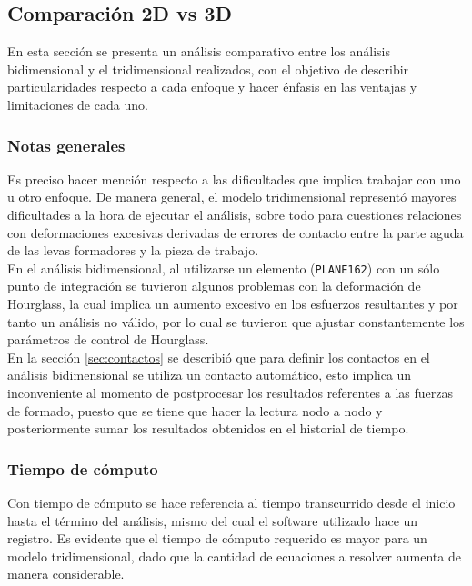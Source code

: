\subsection{Comparación 2D vs 3D}

En esta sección se presenta un análisis comparativo entre los análisis bidimensional 
y el tridimensional realizados, con el objetivo de describir particularidades respecto 
a cada enfoque y hacer énfasis en las ventajas y limitaciones de cada uno.\\

\subsubsection{Notas generales}

Es preciso hacer mención respecto a las dificultades que implica trabajar con uno u 
otro enfoque. De manera general, el modelo tridimensional representó mayores dificultades 
a la hora de ejecutar el análisis, sobre todo para cuestiones relaciones con deformaciones 
excesivas derivadas de errores de contacto entre la parte aguda de las levas formadores 
y la pieza de trabajo.\\

En el análisis bidimensional, al utilizarse un elemento (\texttt{PLANE162}) con un sólo punto 
de integración se tuvieron algunos problemas con la deformación de Hourglass, la cual implica 
un aumento excesivo en los esfuerzos resultantes y por tanto un análisis no válido, por 
lo cual se tuvieron que ajustar constantemente los parámetros de control de Hourglass.\\

En la sección \ref{sec:contactos} se describió que para definir los contactos en el 
análisis bidimensional se utiliza un contacto automático, esto implica un inconveniente 
al momento de postprocesar los resultados referentes a las fuerzas de formado, puesto 
que se tiene que hacer la lectura nodo a nodo y posteriormente sumar los resultados 
obtenidos en el historial de tiempo.\\

\subsubsection{Tiempo de cómputo}

Con tiempo de cómputo se hace referencia al tiempo transcurrido desde el inicio hasta el 
término del análisis, mismo del cual el software utilizado hace un registro. 
Es evidente que el tiempo de cómputo requerido es mayor para un modelo tridimensional, dado 
que la cantidad de ecuaciones a resolver aumenta de manera considerable.\\

